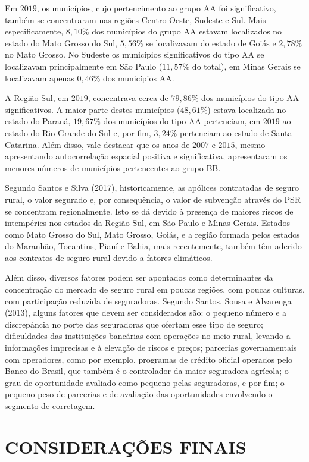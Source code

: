Em $2019$, os municípios, cujo pertencimento ao grupo AA foi significativo, também se concentraram nas regiões Centro-Oeste, Sudeste e Sul. Mais especificamente, $8,10\%$ dos municípios do grupo AA estavam localizados no estado do Mato Grosso do Sul, $5,56\%$ se localizavam do estado de Goiás e $2,78\%$ no Mato Grosso. No Sudeste os municípios significativos do tipo AA se localizavam principalmente em São Paulo ($11,57\%$ do total), em Minas Gerais se localizavam apenas $0,46\%$ dos municípios AA.

A Região Sul, em $2019$, concentrava cerca de $79,86\%$ dos municípios do tipo AA significativos. A maior parte destes municípios ($48,61\%$) estava localizada no estado do Paraná, $19,67\%$ dos municípios do tipo AA pertenciam, em $2019$ ao estado do Rio Grande do Sul e, por fim, $3,24\%$ pertenciam ao estado de Santa Catarina. Além disso, vale destacar que os anos de $2007$ e $2015$, mesmo apresentando autocorrelação espacial positiva e significativa, apresentaram os menores números de municípios pertencentes ao grupo BB.

Segundo Santos e Silva (2017), historicamente, as apólices contratadas de seguro rural, o valor segurado e, por consequência, o valor de subvenção através do PSR se concentram regionalmente. Isto se dá devido à presença de maiores riscos de intempéries nos estados da Região Sul, em São Paulo e Minas Gerais. Estados como Mato Grosso do Sul, Mato Grosso, Goiás, e a região formada pelos estados do Maranhão, Tocantins, Piauí e Bahia, mais recentemente, também têm aderido aos contratos de seguro rural devido a fatores climáticos. 

Além disso, diversos fatores podem ser apontados como determinantes da concentração do mercado de seguro rural em poucas regiões, com poucas culturas, com participação reduzida de seguradoras. Segundo Santos, Sousa e Alvarenga (2013), alguns fatores que devem ser considerados são: o pequeno número e a discrepância no porte das seguradoras que ofertam esse tipo de seguro; dificuldades das instituições bancárias com operações no meio rural, levando a informações imprecisas e à elevação de riscos e preços; parcerias governamentais com operadores, como por exemplo, programas de crédito oficial operados pelo Banco do Brasil, que também é o controlador da maior seguradora agrícola;  o grau de oportunidade avaliado como pequeno pelas seguradoras, e por fim; o pequeno peso de parcerias e de avaliação das oportunidades envolvendo o segmento de corretagem.   

\section{CONSIDERAÇÕES FINAIS}

